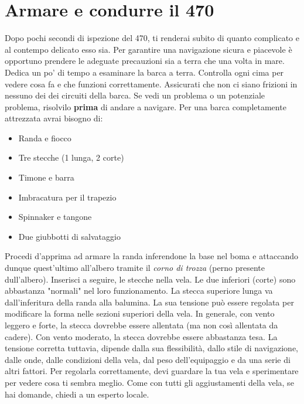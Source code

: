 \renewcommand{\subsectionsPath}{RegolazioneDellaBarca}

\section{Armare e condurre il 470}
\label{sec:RegolazioneDellaBarca}
Dopo pochi secondi di ispezione del 470, ti renderai subito di quanto complicato
e al contempo delicato esso sia. Per garantire una navigazione sicura e
piacevole è opportuno prendere le adeguate precauzioni sia a terra che una volta
in mare. Dedica un po' di tempo a esaminare la barca a terra. Controlla ogni cima per vedere cosa fa e che funzioni correttamente.
Assicurati che non ci siano frizioni in nessuno dei dei circuiti della
barca. Se vedi un problema o un potenziale problema, risolvilo \textbf{prima} di andare a
navigare. Per una barca completamente attrezzata avrai bisogno di:
\begin{itemize}
    \item Randa e fiocco
    \item Tre stecche (1 lunga, 2 corte)
    \item Timone e barra
    \item Imbracatura per il trapezio
    \item Spinnaker e tangone
    \item Due giubbotti di salvataggio
\end{itemize}
Procedi d'apprima ad armare la randa inferendone la base nel boma e attaccando
dunque quest'ultimo all'albero tramite il \emph{corno di trozza} (perno presente
dull'albero). Inserisci a seguire, le stecche nella vela. Le due inferiori (corte)
sono abbastanza "normali" nel loro funzionamento. La stecca superiore lunga va
dall'inferitura della randa alla balumina. La sua tensione può essere regolata
per modificare la forma nelle sezioni superiori
della vela. In generale, con vento leggero e forte, la stecca dovrebbe essere
allentata (ma non così allentata da cadere). Con vento moderato, la stecca
dovrebbe essere abbastanza tesa. La tensione corretta tuttavia, dipende
dalla sua flessibilità, dallo stile di navigazione, dalle onde, dalle
condizioni della vela, dal peso dell'equipaggio e da una serie di altri fattori.
Per regolarla correttamente, devi guardare la tua vela e sperimentare per vedere
cosa ti sembra meglio. Come con tutti gli aggiustamenti della vela, se
hai domande, chiedi a un esperto locale.

